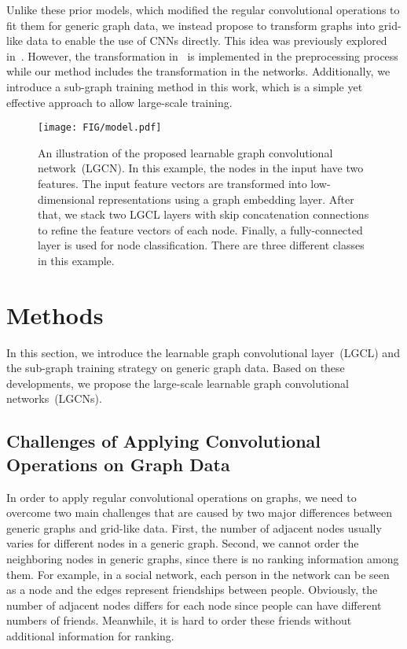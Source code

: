 \documentclass[sigconf]{acmart}
\begin{document}
Unlike these prior models, which modified the regular convolutional
operations to fit them for generic graph data, we instead propose to
transform graphs into grid-like data to enable the use of CNNs
directly. This idea was previously explored
in~\cite{niepert2016learning}. However, the transformation
in~\cite{niepert2016learning} is implemented in the preprocessing
process while our method includes the transformation in the
networks. Additionally, we introduce a sub-graph training method in
this work, which is a simple yet effective approach to allow
large-scale training.


\begin{figure*}[t] \texttt{[image: FIG/model.pdf]}
\caption{An illustration of the proposed learnable graph
convolutional network~(LGCN). In this example, the nodes in the
input have two features. The input feature vectors are transformed
into low-dimensional representations using a graph embedding layer.
After that, we stack two LGCL layers with skip concatenation
connections to refine the feature vectors of each node. Finally, a
fully-connected layer is used for node classification. There are
three different classes in this example.} \label{fig:model}
\end{figure*}


\section{Methods}

In this section, we introduce the learnable graph convolutional
layer~(LGCL) and the sub-graph training strategy on generic graph
data. Based on these developments, we propose the large-scale
learnable graph convolutional networks~(LGCNs).


\subsection{Challenges of Applying Convolutional Operations on Graph Data}\label{sec:challenge}


In order to apply regular convolutional operations on graphs, we
need to overcome two main challenges that are caused by two major
differences between generic graphs and grid-like data. First, the
number of adjacent nodes usually varies for different nodes in a
generic graph. Second, we cannot order the neighboring nodes in
generic graphs, since there is no ranking information among them.
For example, in a social network, each person in the network can be
seen as a node and the edges represent friendships between people.
Obviously, the number of adjacent nodes differs for each node since
people can have different numbers of friends. Meanwhile, it is hard
to order these friends without additional information for ranking.
\end{document}

